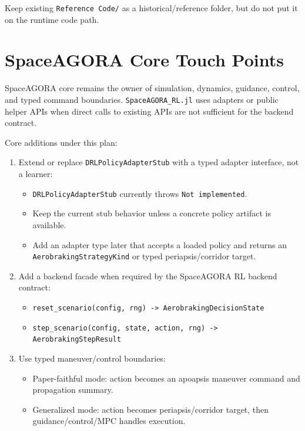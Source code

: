 \documentclass[11pt]{article}
\begin{document}
Keep existing \texttt{Reference Code/} as a historical/reference folder, but do not put it on the runtime code path. 


\section{SpaceAGORA Core Touch Points}

SpaceAGORA core remains the owner of simulation, dynamics, guidance, control, and typed command boundaries. \texttt{SpaceAGORA\_RL.jl} uses adapters or public helper APIs when direct calls to existing APIs are not sufficient for the backend contract.

Core additions under this plan:

\begin{enumerate}
\item Extend or replace \texttt{DRLPolicyAdapterStub} with a typed adapter interface, not a learner:
\begin{itemize}
\item \texttt{DRLPolicyAdapterStub} currently throws \texttt{Not implemented}.
\item Keep the current stub behavior unless a concrete policy artifact is available.
\item Add an adapter type later that accepts a loaded policy and returns an \texttt{AerobrakingStrategyKind} or typed periapsis/corridor target.

\end{itemize}
\item Add a backend facade when required by the SpaceAGORA RL backend contract:
\begin{itemize}
\item \texttt{reset\_scenario(config, rng) -> AerobrakingDecisionState}
\item \texttt{step\_scenario(config, state, action, rng) -> AerobrakingStepResult}

\end{itemize}
\item Use typed maneuver/control boundaries:
\begin{itemize}
\item Paper-faithful mode: action becomes an apoapsis maneuver command and propagation summary.
\item Generalized mode: action becomes periapsis/corridor target, then guidance/control/MPC handles execution.
\end{itemize}
\end{enumerate}
\end{document}
